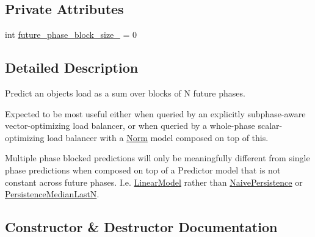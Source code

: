 \subsection*{Private Attributes}
\begin{DoxyCompactItemize}
\item 
int \hyperlink{structvt_1_1vrt_1_1collection_1_1balance_1_1_multiple_phases_a26b2a79fd6145e7e3ab56581a8558584}{future\+\_\+phase\+\_\+block\+\_\+size\+\_\+} = 0
\end{DoxyCompactItemize}


\subsection{Detailed Description}
Predict an object\textquotesingle{}s load as a sum over blocks of N future phases. 

Expected to be most useful either when queried by an explicitly subphase-\/aware vector-\/optimizing load balancer, or when queried by a whole-\/phase scalar-\/optimizing load balancer with a \hyperlink{classvt_1_1vrt_1_1collection_1_1balance_1_1_norm}{Norm} model composed on top of this.

Multiple phase blocked predictions will only be meaningfully different from single phase predictions when composed on top of a Predictor model that is not constant across future phases. I.\+e. {\ttfamily \hyperlink{structvt_1_1vrt_1_1collection_1_1balance_1_1_linear_model}{Linear\+Model}} rather than {\ttfamily \hyperlink{structvt_1_1vrt_1_1collection_1_1balance_1_1_naive_persistence}{Naive\+Persistence}} or {\ttfamily \hyperlink{structvt_1_1vrt_1_1collection_1_1balance_1_1_persistence_median_last_n}{Persistence\+Median\+LastN}}. 

\subsection{Constructor \& Destructor Documentation}
\mbox{\label{structvt_1_1vrt_1_1collection_1_1balance_1_1_multiple_phases_a28aba5fe005d35319e34ca8406aca936}} 
